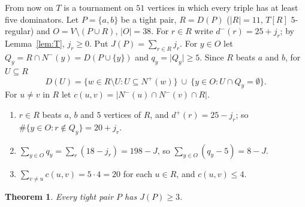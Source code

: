 \documentclass[11pt]{amsart}
\newtheorem{theorem}{Theorem}[section]
\theoremstyle{definition}
\theoremstyle{remark}
\newcommand{\D}{D}
\newcommand{\Nin}{N^{-}}
\newcommand{\Nout}{N^{+}}
\newcommand{\din}{d^{-}}
\newcommand{\dout}{d^{+}}
\newcommand{\abs}[1]{\lvert #1\rvert}
\begin{document}
From now on $T$ is a tournament on $51$ vertices in which every triple has at least five dominators. Let $P=\{a,b\}$ be a tight pair,
$R=\D(P)$ ($\abs R=11$, $T[R]$ $5$-regular) and $O=V\setminus(P\cup R)$, $\abs O=38$. For $r\in R$ write $\din(r)=25+j_r$; by
Lemma~\ref{lem:T}, $j_r\ge0$. Put $J(P)=\sum_{r\in R}j_r$. For $y\in O$ let $Q_y=R\cap\Nin(y)=\D(P\cup\{y\})$ and $q_y=\abs{Q_y}\ge5$.
Since $R$ beats $a$ and $b$, for $U\subseteq R$
\begin{equation}\label{eq:DU}
  \D(U)=\{w\in R\setminus U: U\subseteq\Nout(w)\}\ \cup\ \{y\in O: U\cap Q_y=\emptyset\}.
\end{equation}
For $u\ne v$ in $R$ let $c(u,v)=\abs{\Nin(u)\cap\Nin(v)\cap R}$.
\begin{enumerate}[label=(I\arabic*)]
\item $r\in R$ beats $a$, $b$ and $5$ vertices of $R$, and $\dout(r)=25-j_r$; so $\#\{y\in O:r\notin Q_y\}=20+j_r$.
\item $\sum_{y\in O}q_y=\sum_r(18-j_r)=198-J$, so $\sum_{y\in O}(q_y-5)=8-J$.
\item $\sum_{v\ne u}c(u,v)=5\cdot4=20$ for each $u\in R$, and $c(u,v)\le4$.
\end{enumerate}

\begin{theorem}\label{thm:J3}
Every tight pair $P$ has $J(P)\ge3$.
\end{theorem}
\end{document}
